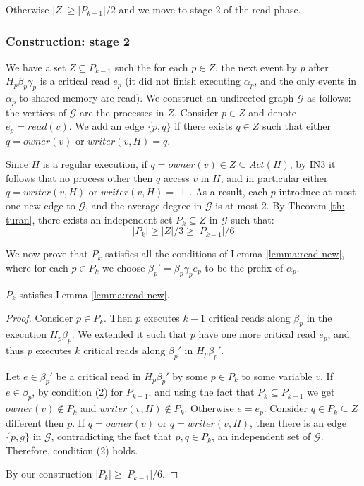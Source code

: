 Otherwise $|Z| \geq |P_{k-1}|/2$ and we move to stage 2 of the read phase.


\subsubsection{Construction: stage 2}

We have a set $Z \subseteq P_{k-1}$ such the for each $p \in Z$, the next event by $p$ after $H_p \beta_p \gamma_p$ is a critical read $e_p$ (it did not finish executing $\alpha_p$, and the only events in $\alpha_p$ to shared memory are read).
We construct an undirected graph $\mathcal{G}$ as follows: the vertices of $\mathcal{G}$ are the processes in $Z$. Consider $p \in Z$ and denote $e_p = read(v)$. We add an edge $\{p,q\}$ if there exists $q \in Z$ such that either $q = owner(v)$ or $writer(v, H) = q$.

Since $H$ is a regular execution, if $q = owner(v) \in Z \subseteq Act(H)$, by IN3 it follows that no process other then $q$ access $v$ in $H$, and in particular either $q = writer(v,H)$ or $writer(v,H) = \perp$.
As a result, each $p$ introduce at most one new edge to $\mathcal{G}$, and the average degree in $\mathcal{G}$ is at most 2. By Theorem \ref{th: turan}, there exists an independent set $P_k \subseteq Z$ in $\mathcal{G}$ such that:
$$|P_k| \geq |Z|/3 \geq |P_{k-1}|/6$$

We now prove that $P_k$ satisfies all the conditions of Lemma \ref{lemma:read-new}, where for each $p \in P_k$ we choose $\beta_p' = \beta_p \gamma_p e_p$ to be the prefix of $\alpha_p$.

\begin{claim-subsection}
	$P_k$ satisfies Lemma \ref{lemma:read-new}.
\end{claim-subsection}

\begin{proof}
	Consider $p \in P_k$. Then $p$ executes $k-1$ critical reads along $\beta_p$ in the execution $H_p \beta_p$. We extended it such that $p$ have one more critical read $e_p$, and thus $p$ executes $k$ critical reads along $\beta_p'$ in $H_p \beta_p'$.
	
	Let $e \in \beta_p'$ be a critical read in $H_p \beta_p'$ by some $p \in P_k$ to some variable $v$. If $e \in \beta_p$, by condition (2) for $P_{k-1}$, and using the fact that $P_k \subseteq P_{k-1}$ we get $owner(v) \notin P_k$ and $writer(v,H) \notin P_k$. Otherwise $e = e_p$. Consider $q \in P_k \subseteq Z$ different then $p$. If $q = owner(v)$ or $q = writer(v,H)$, then there is an edge $\{p,g\}$ in $\mathcal{G}$, contradicting the fact that $p,q \in P_k$, an independent set of $\mathcal{G}$. Therefore, condition (2) holds.
	
	By our construction $|P_k| \geq |P_{k-1}|/6$.
	
\end{proof}

